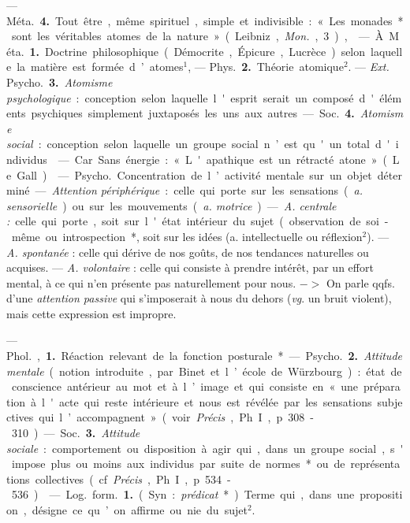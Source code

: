 \begin{itemize}[leftmargin=1cm, label=, itemsep=1pt]
{{{— \si{Méta.} {\bf 4.} Tout être, même spirituel, simple et indivisible : « Les
monades* sont les véritables atomes
de la nature » (Leibniz, {\it Mon.}, 3),

 — À \si{Méta.} {\bf 1.} Doctrine philosophique (Démocrite, Épicure,
Lucrèce) selon laquelle la matière est
formée d’atomes$^1$, — \si{Phys.} {\bf 2.} Théorie
atomique$^2$. — {\it Ext.} \si{Psycho.} {\bf 3.} {\it Atomisme psychologique} : conception
selon laquelle l'esprit serait un
composé d'éléments psychiques
simplement juxtaposés les uns aux
autres. — \si{Soc.} {\bf 4.} {\it Atomisme social} :
conception selon laquelle un groupe
social n’est qu'un total d'individus.

 — Car. Sans énergie : « L'apathique est un rétracté atone »
(Le Gall).

 — \si{Psycho.} Concentration
de l’activité mentale sur un objet
déterminé. — {\it Attention périphérique} : celle qui porte sur les sensations
({\it a. sensorielle}) ou sur les mouvements ({\it a. motrice}). — {\it A. centrale :}
celle qui porte, soit sur l'état intérieur du sujet (observation de
soi-même ou introspection*}, soit sur les
idées (a. intellectuelle ou réflexion$^2$).
— {\it A. spontanée} : celle qui dérive de
nos goûts, de nos tendances naturelles ou acquises. — {\it A. volontaire} :
celle qui consiste à prendre intérêt,
par un effort mental, à ce qui n’en
présente pas naturellement pour
nous. $->$ On parle qqfs. d’une
{\it attention passive} qui s'imposerait à
nous du dehors ({\it vg}. un bruit violent),
mais cette expression est impropre.

 — \si{Phol.}, {\bf 1.} Réaction relevant de la fonction posturale*.

— \si{Psycho.} {\bf 2.} {\it Attitude mentale}
(notion introduite, par Binet et
l’école de Würzbourg) : état de conscience antérieur au mot et à l’image
et qui consiste en « une préparation
à l'acte qui reste intérieure et nous
est révélée par les sensations subjectives qui l’accompagnent » (voir
{\it Précis}, Ph. I, p. 308-310).

— \si{Soc.} {\bf 3.} {\it Attitude sociale} : comportement ou disposition à agir qui,
dans un groupe social, s'impose plus
ou moins aux individus par suite de
normes* ou de représentations collectives (cf. {\it Précis}, Ph. I, p. 534-536).

 — \si{Log.} \si{form.} {\bf 1.} (Syn. : {\it prédicat}*). Terme qui, dans
une proposition, désigne ce qu’on affirme
ou nie du sujet$^2$.

}}
\end{itemize}
